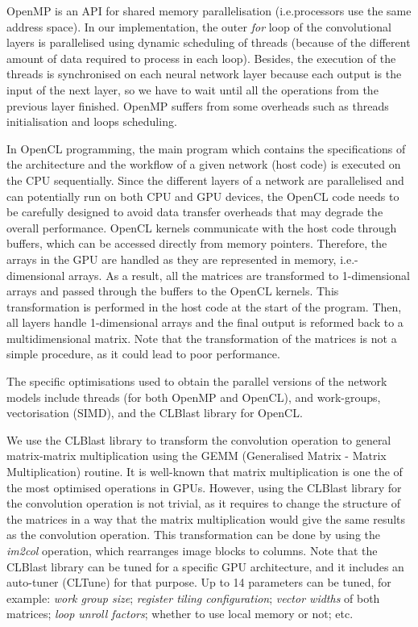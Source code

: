 \documentclass[conference]{IEEEtran}
\begin{document}
OpenMP is an API for shared memory parallelisation (i.e.\all processors use the same address space). In our implementation, the outer \emph{for} loop of the convolutional layers is parallelised using dynamic scheduling of threads (because of the different amount of data required to process in each loop). Besides, the execution of the threads is synchronised on each neural network layer because each output is the input of the next layer, so we have to wait until all the operations from the previous layer finished. OpenMP suffers from some overheads such as threads initialisation and loops scheduling. 

In OpenCL programming, the main program which contains the specifications of the architecture and the workflow of a given network (host code) is executed on the CPU sequentially. Since the different layers of a network are parallelised and can potentially run on both CPU and GPU devices, the OpenCL code needs to be carefully designed to avoid data transfer overheads that may degrade the overall performance. OpenCL kernels communicate with the host code through buffers, which can be accessed directly from memory pointers. Therefore, the arrays in the GPU are handled as they are represented in memory, i.e.-dimensional arrays. As a result, all the matrices are transformed to 1-dimensional arrays and passed through the buffers to the OpenCL kernels. This transformation is performed in the host code at the start of the program. Then, all layers handle 1-dimensional arrays and the final output is reformed back to a multidimensional matrix. Note that the transformation of the matrices is not a simple procedure, as it could lead to poor performance.

The specific optimisations used to obtain the parallel versions of the network models include threads (for both OpenMP and OpenCL), and work-groups, vectorisation (SIMD), and the CLBlast library \cite{Nugteren17} for OpenCL.

We use the CLBlast library \cite{Nugteren17} to transform the convolution operation to general matrix-matrix multiplication using the GEMM (Generalised Matrix - Matrix Multiplication) routine. It is well-known that matrix multiplication is one the of the most optimised operations in GPUs. However, using the CLBlast library for the convolution operation is not trivial, as it requires to change the structure of the matrices in a way that the matrix multiplication would give the same results as the convolution operation. This transformation can be done by using the \emph{im2col} operation, which rearranges image blocks to columns. Note that the CLBlast library can be tuned for a specific GPU architecture, and it includes an auto-tuner (CLTune) for that purpose. Up to 14 parameters can be tuned, for example: \emph{work group size}; \emph{register tiling configuration}; \emph{vector widths} of both matrices; \emph{loop unroll factors}; whether to use local memory or not; etc.
\end{document}
